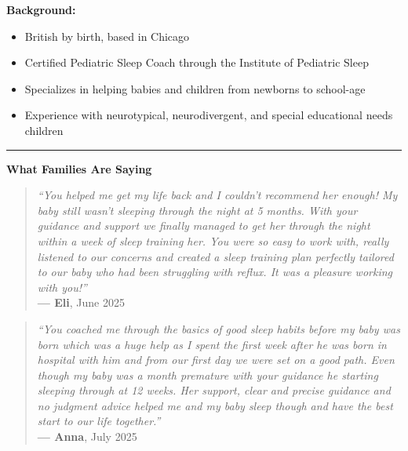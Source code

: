 \documentclass{article}
\newcommand{\sectiontitle}[1]{%
{\color{accentcolor}\normalsize\bfseries #1}%
\vspace{0.15em} %
}
\begin{document}
\vspace{0.05em} %
\textbf{Background:}
\begin{itemize}[leftmargin=*,noitemsep,topsep=0pt,itemsep=0pt] %
    \item British by birth, based in Chicago
    \item Certified Pediatric Sleep Coach through the Institute of Pediatric Sleep
    \item Specializes in helping babies and children from newborns to school-age
    \item Experience with neurotypical, neurodivergent, and special educational needs children
\end{itemize}

\vspace{0.8em} %
\hrule %

\vspace{0.15em} %
\sectiontitle{What Families Are Saying}
\singlespacing %

\begin{multicols}{2} %
    \begin{quote}
        \textit{\footnotesize ``You helped me get my life back and I couldn't recommend her enough! My baby still wasn't sleeping through the night at 5 months. With your guidance and support we finally managed to get her through the night within a week of sleep training her. You were so easy to work with, really listened to our concerns and created a sleep training plan perfectly tailored to our baby who had been struggling with reflux. It was a pleasure working with you!''} \\[0.05cm] %
        \textbf{\footnotesize — Eli}, June 2025
    \end{quote}

    \columnbreak %

    \begin{quote}
        \textit{\footnotesize ``You coached me through the basics of good sleep habits before my baby was born which was a huge help as I spent the first week after he was born in hospital with him and from our first day we were set on a good path. Even though my baby was a month premature with your guidance he starting sleeping through at 12 weeks. Her support, clear and precise guidance and no judgment advice helped me and my baby sleep though and have the best start to our life together.''} \\[0.05cm] %
        \textbf{\footnotesize — Anna}, July 2025
    \end{quote}
\end{multicols} %
\onehalfspacing %
\end{document}
